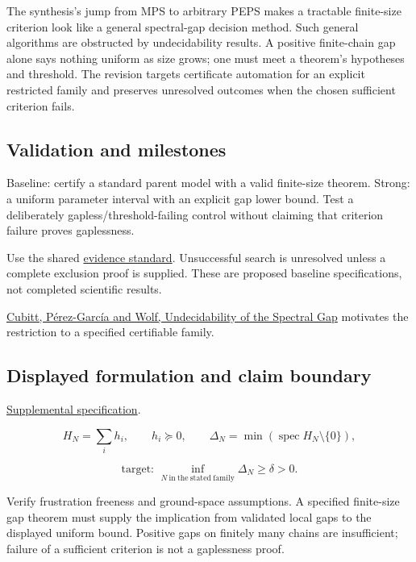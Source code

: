\documentclass[
  11pt,
]{article}
\begin{document}
The synthesis's jump from MPS to arbitrary PEPS makes a tractable
finite-size criterion look like a general spectral-gap decision method.
Such general algorithms are obstructed by undecidability results. A
positive finite-chain gap alone says nothing uniform as size grows; one
must meet a theorem's hypotheses and threshold. The revision targets
certificate automation for an explicit restricted family and preserves
unresolved outcomes when the chosen sufficient criterion fails.

\subsection{Validation and milestones}

Baseline: certify a standard parent model with a valid finite-size
theorem. Strong: a uniform parameter interval with an explicit gap lower
bound. Test a deliberately gapless/threshold-failing control without
claiming that criterion failure proves gaplessness.

Use the shared
\href{https://github.com/rick-stevens-ai/Pure-Thought/blob/main/reviews/EVIDENCE-STANDARD.md}{evidence
standard}. Unsuccessful search is unresolved unless a complete exclusion
proof is supplied. These are proposed baseline specifications, not
completed scientific results.

\href{https://arxiv.org/abs/1502.04573}{Cubitt, Pérez-García and Wolf,
Undecidability of the Spectral Gap} motivates the restriction to a
specified certifiable family.

\subsection{Displayed formulation and claim boundary}

\href{https://github.com/rick-stevens-ai/Pure-Thought/blob/main/supplemental/S07.md}{Supplemental
specification}.

\[H_N=\sum_i h_i,\qquad h_i\succeq0,\qquad
\Delta_N=\min(\operatorname{spec}H_N\setminus\{0\}),\]

\[\text{target: }\inf_{N\ \mathrm{in\ the\ stated\ family}}\Delta_N\ge\delta>0.\]

Verify frustration freeness and ground-space assumptions. A specified
finite-size gap theorem must supply the implication from validated local
gaps to the displayed uniform bound. Positive gaps on finitely many
chains are insufficient; failure of a sufficient criterion is not a
gaplessness proof.
\end{document}
